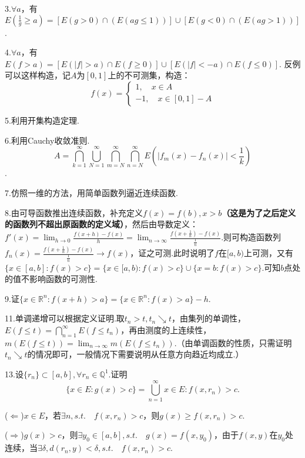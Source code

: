 \documentclass[bwprint, withoutpreface]{cumcmthesis}
\begin{document}
3.$\forall a$，有$E(\frac{1}{g} \geqslant a) = [E(g > 0) \cap (E(ag \leqslant 1))] \cup [E(g < 0) \cap (E(ag > 1))]$.

4.$\forall a$，有$E(f > a) = [E(|f| > a) \cap E(f \geqslant 0)] \cup [E(|f| < -a) \cap E(f \leqslant 0)]$. 反例可以这样构造，记$A \mbox{为} [0, 1]$上的不可测集，构造：
\begin{equation*}
	f(x) = 
	\begin{cases}
		1, \quad x \in A \\
		-1, \quad x \in [0, 1] - A
	\end{cases}
\end{equation*}

5.利用开集构造定理.

6.利用Cauchy收敛准则.\[A = \bigcap_{k = 1}^{\infty}{\bigcup_{N = 1}^{\infty}{\bigcap_{m = N}^{\infty}{\bigcap_{n = N}^{\infty}{E(|f_m(x) - f_n(x)| < \frac{1}{k})}}}}\].

7.仿照一维的方法，用简单函数列逼近连续函数.

8.由可导函数推出连续函数，补充定义$f(x) = f(b), x > b$\textbf{（这是为了之后定义的函数列不超出原函数的定义域）}，然后由导数定义：$f'(x) = \lim_{h \to 0}{\frac{f(x + h) - f(x)}{h}} = \lim_{n \to \infty}{\frac{f(x + \frac{1}{n}) - f(x)}{\frac{1}{n}}}$.则可构造函数列$f_n(x) = \frac{f(x + \frac{1}{n}) - f(x)}{\frac{1}{n}} \to f(x)$，证之可测.此时说明了$f$在$[a, b)$上可测，又有$\{x \in [a, b]: f(x) > c\} = \{x \in [a, b): f(x) > c\} \cup \{x = b: f(x) > c\}$.可知$b$点处的值不影响函数的可测性.

9.证$\{x \in \mathbb{R}^n: f(x + h) > a\} = \{x \in \mathbb{R}^n: f(x) > a\} - h$.

11.单调递增可以根据定义证明.取$t_n > t, t_n \searrow t$，由集列的单调性，$E(f \leqslant t) = \bigcap_{n = 1}^{\infty}{E(f \leqslant t_n)}$，再由测度的上连续性，$m(E(f \leqslant t))= \lim_{n \to \infty}{m(E(f \leqslant t_n))}$.（由单调函数的性质，只需证明$t_n \searrow t$的情况即可，一般情况下需要说明从任意方向趋近均成立.）

13.设$\{r_n\} \subset [a, b], \forall r_n \in \mathbb{Q}^1$.证明
\begin{equation*}
	\{x \in E: g(x) > c\} = \bigcup_{n = 1}^{\infty}{x \in E: f(x, r_n) > c}.
\end{equation*}

($\Leftarrow$)$x \in E$，若$\exists n, s.t. \quad f(x, r_n) > c$，则$g(x) \geqslant f(x, r_n) > c$.

($\Rightarrow$)$g(x) > c$，则$\exists y_0 \in [a, b], s.t. \quad g(x) = f(x, y_0)$，由于$f(x, y)$在$y_0$处连续，当$\exists \delta, d(r_n, y) < \delta, s.t. \quad f(x, r_n) > c$.
\end{document}
